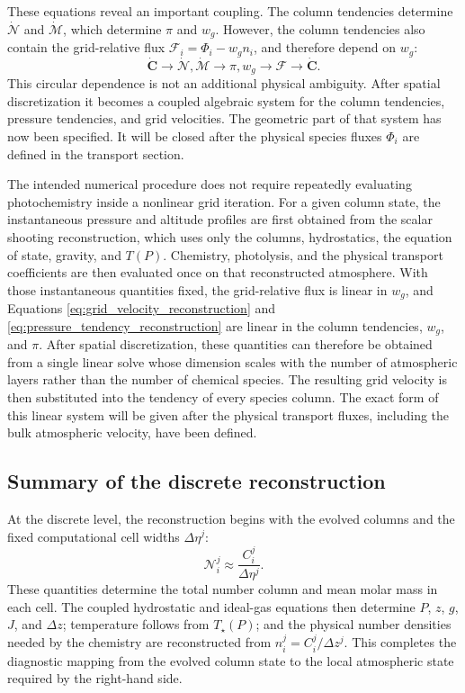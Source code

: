 \documentclass[twocolumn]{aastex631}
\begin{document}
These equations reveal an important coupling. The column tendencies determine
$\dot{\mathcal{N}}$ and $\dot{\mathcal{M}}$, which determine $\pi$ and $w_g$.
However, the column tendencies also contain the grid-relative flux
$\mathcal{F}_i=\Phi_i-w_g n_i$, and therefore depend on $w_g$:
\begin{equation}
  \dot{\bm{C}}
  \longrightarrow
  \dot{\mathcal{N}},\dot{\mathcal{M}}
  \longrightarrow
  \pi,w_g
  \longrightarrow
  \bm{\mathcal{F}}
  \longrightarrow
  \dot{\bm{C}}.
  \label{eq:grid_velocity_coupling}
\end{equation}
This circular dependence is not an additional physical ambiguity. After
spatial discretization it becomes a coupled algebraic system for the column
tendencies, pressure tendencies, and grid velocities. The geometric part of
that system has now been specified. It will be closed after the physical
species fluxes $\Phi_i$ are defined in the transport section.

The intended numerical procedure does not require repeatedly evaluating
photochemistry inside a nonlinear grid iteration. For a given column state,
the instantaneous pressure and altitude profiles are first obtained from the
scalar shooting reconstruction, which uses only the columns, hydrostatics,
the equation of state, gravity, and $T(P)$. Chemistry, photolysis, and the
physical transport coefficients are then evaluated once on that reconstructed
atmosphere. With those instantaneous quantities fixed, the grid-relative flux
is linear in $w_g$, and Equations \eqref{eq:grid_velocity_reconstruction} and
\eqref{eq:pressure_tendency_reconstruction} are linear in the column
tendencies, $w_g$, and $\pi$. After spatial discretization, these quantities
can therefore be obtained from a single linear solve whose dimension scales
with the number of atmospheric layers rather than the number of chemical
species. The resulting grid velocity is then substituted into the tendency
of every species column. The exact form of this linear system will be given
after the physical transport fluxes, including the bulk atmospheric velocity,
have been defined.

\subsection{Summary of the discrete reconstruction}
\label{sec:discrete_reconstruction_summary}

At the discrete level, the reconstruction begins with the evolved columns and
the fixed computational cell widths $\Delta\eta^j$:
\begin{equation}
  \mathcal{N}_i^j\approx\frac{C_i^j}{\Delta\eta^j}.
  \label{eq:discrete_transformed_density}
\end{equation}
These quantities determine the total number column and mean molar mass in
each cell. The coupled hydrostatic and ideal-gas equations then determine
$P$, $z$, $g$, $J$, and $\Delta z$; temperature follows from $T_\star(P)$;
and the physical number densities needed by the chemistry are reconstructed
from $n_i^j=C_i^j/\Delta z^j$. This completes the diagnostic mapping from the
evolved column state to the local atmospheric state required by the
right-hand side.
\end{document}
